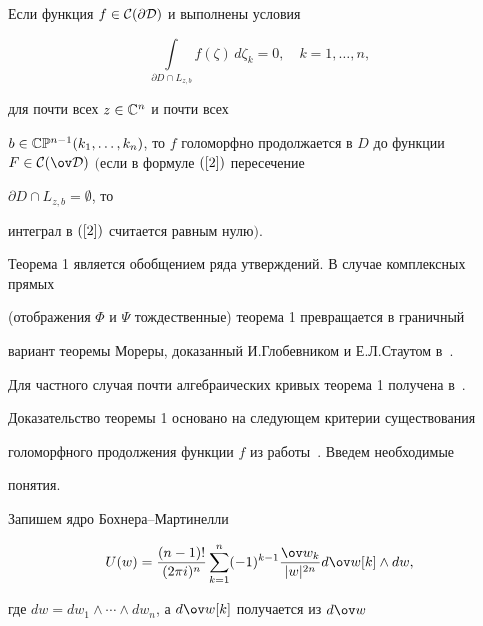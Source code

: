 \begin{thm}


Если функция $f\in\cal C(\partial D)$ и выполнены условия


\begin{equation}\label{2}


\int\limits_{\partial D\cap L_{z,b}}f(\zeta)\,d\zeta_k=0,\quad k=1,\dotsc,n,


\end{equation}


для почти всех $z\in\Bbb{C}^n$ и почти всех


$b\in\Bbb C\Bbb P^{n-1}(k_1,\dotsc,


k_n)$, то $f$ голоморфно продолжается в $D$ до функции $F\in\cal C(\ov


D)$ $($если в формуле $(\ref{2})$ пересечение


$\partial D\cap L_{z,b}=\emptyset$, то


интеграл в $(\ref{2})$ считается равным нулю$)$.


\end{thm}





Теорема 1 является обобщением ряда утверждений. В случае комплексных прямых


(отображения $\Phi$ и $\Psi$ тождественные) теорема 1 превращается в граничный


вариант теоремы Мореры, доказанный И.Глобевником и Е.Л.Стаутом в~\cite{GS}.


Для частного случая почти алгебраических кривых теорема 1 получена в~\cite{M}.





Доказательство теоремы 1 основано на следующем критерии существования


голоморфного продолжения функции $f$ из работы~\cite{M}. Введем необходимые


понятия.





Запишем ядро Бохнера--Мартинелли


$$


U(w)=\frac{(n-1)!}{(2\pi i)^n}\sum\limits_{k=1}^{n} (-1)^{k-1}\frac


{\ov w_k}{|w|^{2n}} d\ov w[k]\wedge dw,


$$


где $dw=dw_1\wedge\dotsb\wedge dw_n$, а $d\ov w[k]$ получается из $d\ov w$


